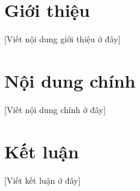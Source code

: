 \section{Giới thiệu}
[Viết nội dung giới thiệu ở đây]

\section{Nội dung chính}
[Viết nội dung chính ở đây]

\section{Kết luận}
[Viết kết luận ở đây]
